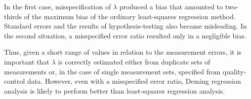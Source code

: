 In the first case, misspecification of $\lambda$ produced a bias that amounted to two-thirds of the maximum bias of the 
ordinary least-squares regression method. Standard errors and the results of hypothesis-testing also became misleading. 
In the second situation, a misspecified error ratio resulted only in a negligible bias. 

Thus, given a short range of values in relation to the measurement errors, it is important that $\lambda$ is correctly 
estimated either from duplicate sets of measurements or, in the case of single measurement sets, specified from 
quality-control data. However, even with a misspecified error ratio, Deming regression analysis is likely to perform 
better than least-squares regression analysis.

